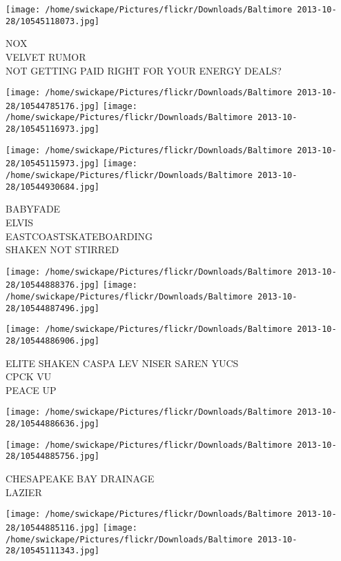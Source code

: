 \documentclass[10pt,letterpaper]{article}
\begin{document}
\vspace{0.25in}
\texttt{[image: /home/swickape/Pictures/flickr/Downloads/Baltimore 2013-10-28/10545118073.jpg]}

NOX\\
VELVET RUMOR\\
NOT GETTING PAID RIGHT FOR YOUR ENERGY DEALS?\\
\pagebreak

\texttt{[image: /home/swickape/Pictures/flickr/Downloads/Baltimore 2013-10-28/10544785176.jpg]}
\texttt{[image: /home/swickape/Pictures/flickr/Downloads/Baltimore 2013-10-28/10545116973.jpg]}

\texttt{[image: /home/swickape/Pictures/flickr/Downloads/Baltimore 2013-10-28/10545115973.jpg]}
\texttt{[image: /home/swickape/Pictures/flickr/Downloads/Baltimore 2013-10-28/10544930684.jpg]}

BABYFADE\\
ELVIS\\
EASTCOASTSKATEBOARDING\\
SHAKEN NOT STIRRED\\
\pagebreak

\texttt{[image: /home/swickape/Pictures/flickr/Downloads/Baltimore 2013-10-28/10544888376.jpg]}
\texttt{[image: /home/swickape/Pictures/flickr/Downloads/Baltimore 2013-10-28/10544887496.jpg]}

\texttt{[image: /home/swickape/Pictures/flickr/Downloads/Baltimore 2013-10-28/10544886906.jpg]}

ELITE SHAKEN CASPA LEV NISER SAREN YUCS\\
CPCK VU\\
PEACE UP\\
\pagebreak

\texttt{[image: /home/swickape/Pictures/flickr/Downloads/Baltimore 2013-10-28/10544886636.jpg]}

\vspace{0.25in}
\texttt{[image: /home/swickape/Pictures/flickr/Downloads/Baltimore 2013-10-28/10544885756.jpg]}

CHESAPEAKE BAY DRAINAGE\\
LAZIER\\
\pagebreak

\texttt{[image: /home/swickape/Pictures/flickr/Downloads/Baltimore 2013-10-28/10544885116.jpg]}
\texttt{[image: /home/swickape/Pictures/flickr/Downloads/Baltimore 2013-10-28/10545111343.jpg]}
\end{document}
